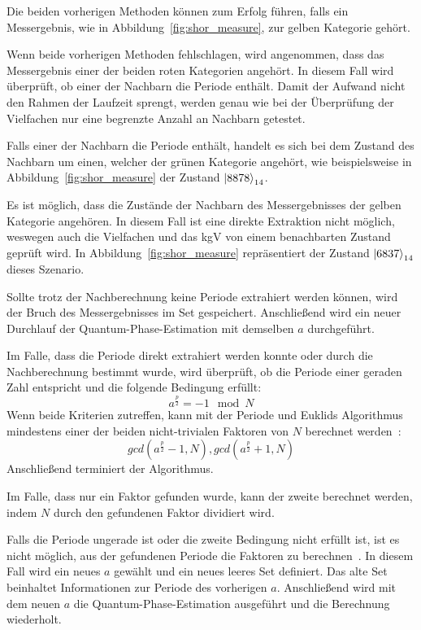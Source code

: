 Die beiden vorherigen Methoden können zum Erfolg führen, 
falls ein Messergebnis, wie in Abbildung~\ref{fig:shor_measure}, 
zur gelben Kategorie gehört. 

Wenn beide vorherigen Methoden fehlschlagen, 
wird angenommen, dass das Messergebnis einer der beiden roten Kategorien angehört.
In diesem Fall wird überprüft, ob einer der Nachbarn die Periode enthält.
Damit der Aufwand nicht den Rahmen der Laufzeit sprengt, 
werden genau wie bei der Überprüfung der Vielfachen
nur eine begrenzte Anzahl an Nachbarn getestet.

Falls einer der Nachbarn die Periode enthält, 
handelt es sich bei dem Zustand des Nachbarn um einen, 
welcher der grünen Kategorie angehört, 
wie beispielsweise in Abbildung~\ref{fig:shor_measure} der Zustand \(\ket{8878}_{14}\).

Es ist möglich, 
dass die Zustände der Nachbarn des Messergebnisses der gelben Kategorie angehören.
In diesem Fall ist eine direkte Extraktion nicht möglich, 
weswegen auch die Vielfachen und das kgV von einem benachbarten Zustand geprüft wird.
In Abbildung~\ref{fig:shor_measure} repräsentiert der Zustand \(\ket{6837}_{14}\) dieses Szenario.

Sollte trotz der Nachberechnung keine Periode extrahiert werden können, 
wird der Bruch des Messergebnisses im Set gespeichert.
Anschließend wird ein neuer Durchlauf der Quantum-Phase-Estimation 
mit demselben \(a\) durchgeführt.

Im Falle, dass die Periode direkt extrahiert werden konnte oder 
durch die Nachberechnung bestimmt wurde, wird überprüft, 
ob die Periode einer geraden Zahl entspricht und die folgende Bedingung erfüllt:
\[a^{\frac{p}{2}} = -1 \mod N\]
Wenn beide Kriterien zutreffen, 
kann mit der Periode und 
Euklids Algorithmus mindestens einer der beiden nicht-trivialen Faktoren von \(N\) berechnet werden~\cite{Shor_1997}:
\[gcd(a^{\frac{p}{2}}-1, N), gcd(a^{\frac{p}{2}}+1, N)\]
Anschließend terminiert der Algorithmus. 

Im Falle, dass nur ein Faktor gefunden wurde, kann der zweite berechnet werden, 
indem \(N\) durch den gefundenen Faktor dividiert wird.

Falls die Periode ungerade ist oder die zweite Bedingung nicht erfüllt ist, 
ist es nicht möglich, aus der gefundenen Periode die Faktoren zu berechnen~\cite{Shor_1997}.
In diesem Fall wird ein neues \(a\) gewählt und ein neues leeres Set definiert. 
Das alte Set beinhaltet Informationen zur Periode des vorherigen \(a\).
Anschließend wird mit dem neuen \(a\) die Quantum-Phase-Estimation ausgeführt und 
die Berechnung wiederholt.

